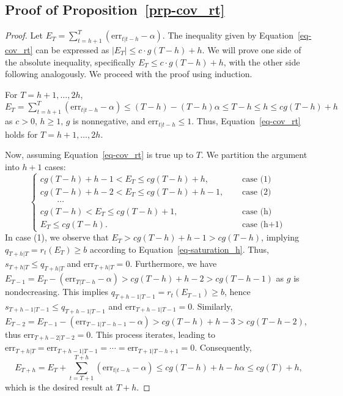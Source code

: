 \documentclass[
  11pt,
  a4paper,
]{article}
\theoremstyle{plain}
\theoremstyle{remark}
\begin{document}
\subsection{\texorpdfstring{Proof of
Proposition~\ref{prp-cov_rt}}{Proof of Proposition~}}\label{sec-proof_cov_rt}

\begin{proof}
Let \(E_T=\sum_{t=h+1}^{T}(\mathrm{err}_{t|t-h}-\alpha)\). The
inequality given by Equation~\ref{eq-cov_rt} can be expressed as
\(|E_T| \leq c \cdot g(T-h) + h\). We will prove one side of the
absolute inequality, specifically \(E_T \leq c \cdot g(T-h) + h\), with
the other side following analogously. We proceed with the proof using
induction.

For \(T=h+1,\ldots,2h\),
\(E_T = \sum_{t=h+1}^{T}(\mathrm{err}_{t|t-h}-\alpha) \leq (T-h)-(T-h)\alpha \leq T-h \leq h \leq cg(T-h) + h\)
as \(c>0\), \(h\geq 1\), \(g\) is nonnegative, and
\(\mathrm{err}_{t|t-h} \leq 1\). Thus, Equation~\ref{eq-cov_rt} holds
for \(T=h+1,\ldots,2h\).

Now, assuming Equation~\ref{eq-cov_rt} is true up to \(T\). We partition
the argument into \(h+1\) cases: \[
\begin{cases}
cg(T-h)+h-1 < E_T \leq cg(T-h)+h, & \quad \text { case (1) } \\
cg(T-h)+h-2 < E_T \leq cg(T-h)+h-1, & \quad \text { case (2) } \\
\qquad \cdots \\
cg(T-h) < E_T \leq cg(T-h)+1, & \quad \text { case (h) } \\
E_T \leq cg(T-h). & \quad \text { case (h+1) }
\end{cases}
\] In case (1), we observe that \(E_T > cg(T-h)+h-1 > cg(T-h)\),
implying \(q_{T+h|T} = r_t(E_{T}) \geq b\) according to
Equation~\ref{eq-saturation_h}. Thus, \(s_{T+h|T} \leq q_{T+h|T}\) and
\(\mathrm{err}_{T+h|T} = 0\). Furthermore, we have
\(E_{T-1} = E_T - (\mathrm{err}_{T|T-h} - \alpha) > cg(T-h)+h-2 > cg(T-h-1)\)
as \(g\) is nondecreasing. This implies
\(q_{T+h-1|T-1} = r_t(E_{T-1}) \geq b\), hence
\(s_{T+h-1|T-1} \leq q_{T+h-1|T-1}\) and
\(\mathrm{err}_{T+h-1|T-1} = 0\). Similarly,
\(E_{T-2} = E_{T-1} - (\mathrm{err}_{T-1|T-h-1} - \alpha) > cg(T-h)+h-3 > cg(T-h-2)\),
thus \(\mathrm{err}_{T+h-2|T-2} = 0\). This process iterates, leading to
\(\mathrm{err}_{T+h|T} = \mathrm{err}_{T+h-1|T-1} = \cdots = \mathrm{err}_{T+1|T-h+1} = 0\).
Consequently, \[
E_{T+h} = E_T+\sum_{t=T+1}^{T+h}(\mathrm{err}_{t|t-h}-\alpha) \leq cg(T-h)+h-h\alpha \leq cg(T)+h,
\] which is the desired result at \(T+h\).


\end{proof}
\end{document}
